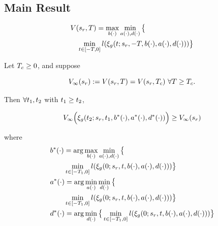 \subsection{Main Result}
 \begin{equation}
 \begin{aligned}
& V(s_r, T) = \max_{b(\cdot)} \min_{a(\cdot), d(\cdot)} \big\{\\
&\quad \min_{t \in [-T, 0]} l(\xi_g(t; s_r, -T, b(\cdot), a(\cdot), d(\cdot)))\big\} 
 \end{aligned}
  \end{equation}
 
 \begin{thm}
   \label{thm:main}
   Let $T_c \ge 0$, and suppose
   
   \begin{equation}
   \label{eq:conv_valfunc}
   V_\infty(s_r) := V(s_r, T) = V(s_r, T_c) ~ \forall T \ge T_c.
   \end{equation}
   
   Then $\forall t_1, t_2$ with $t_1 \ge t_2$,
   
   \begin{equation}
   V_\infty\Big(\xi_g(t_2; s_r, t_1, b^*(\cdot), a^*(\cdot), d^*(\cdot))\Big) \ge V_\infty(s_r)
   \end{equation}
   
   \noindent where
   \begin{equation}
   \begin{aligned}
   & b^*(\cdot) = \arg \max_{b(\cdot)} \min_{a(\cdot), d(\cdot)}\big\{ \\
   & \qquad \min_{t \in [-T_1, 0]} l(\xi_g(0; s_r, t, b(\cdot), a(\cdot), d(\cdot))) \big\}\\
   & a^*(\cdot) = \arg \min_{a(\cdot)} \min_{d(\cdot)} \big\{ \\
   & \qquad \min_{t \in [-T_1, 0]} l(\xi_g(0; s_r, t, b(\cdot), a(\cdot), d(\cdot))) \big\} \\
   & d^*(\cdot) = \arg \min_{d(\cdot)} \big\{\min_{t \in [-T_1, 0]} l(\xi_g(0; s_r, t, b(\cdot), a(\cdot),  d(\cdot))) \big\}
   \end{aligned}
   \end{equation}
   
 \end{thm}
 
